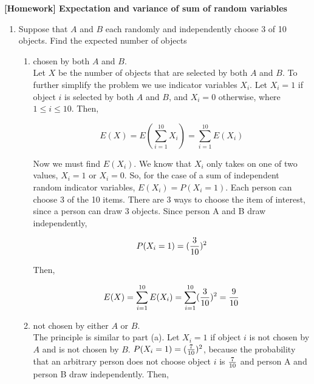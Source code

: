\documentclass[12pt]{article}%
\newcommand{\0}{{\bf 0}}
\newcommand{\ra}[1]{\renewcommand{\arraystretch}{#1}}
\begin{document}
\newcommand{\ngi}{n \ra \infty}

\pagestyle{myheadings} 

\thispagestyle{plain}


\begin{center}
{\Large{\bf [Homework] Expectation and variance of sum of random variables}} 
\end{center}


\begin{enumerate}











 
 
 
 
 
 
\item
Suppose that $A$ and $B$ each randomly and independently choose 3 of 10 objects. Find the expected number of objects
\begin{enumerate}
\item chosen by both $A$ and $B$.
\\
{\color{blue}{\bf Sol.}}
Let $X$ be the number of objects that are selected by both $A$ and $B$. To further simplify
 the problem we use indicator variables $X_i$. Let $X_i = 1$ if object $i$ is selected by both $A$
 and $B$, and $X_i = 0$ otherwise, where $1\le i\le10$. Then,

$$E(X)=E(\sum_{i=1}^{10} X_i)=\sum_{i=1}^{10} E(X_i)$$

Now we must find $E(X_i)$. We know that $X_i$ only takes on one of two values, $X_i = 1$ or
 $X_i = 0$. So, for the case of a sum of independent random indicator variables, $E(X_i) =
 P(X_i = 1)$.
 Each person can choose 3 of the 10 items. There are 3 ways to choose the item of
 interest, since a person can draw 3 objects. Since person A and B draw independently,

$$P(X_i=1)=(\frac{3}{10})^2$$

Then,

$$E(X)=\sum_{i=1}^{10} E(X_i)=\sum_{i=1}^{10} (\frac{3}{10})^2 =\frac{9}{10}$$




\item not chosen by either $A$  or $B$.
\\
{\color{blue}{\bf Sol.}}
The principle is similar to part (a). Let $X_i = 1$ if object $i$ is not chosen by $A$ and is not chosen by $B$. $P(X_i = 1) = (\frac{7}{10})^2$, because the probability that an arbitrary person does
 not choose object $i$ is $\frac{7}{10}$ and person A and person B draw independently. Then,


\end{enumerate}
\end{enumerate}
\end{document}
